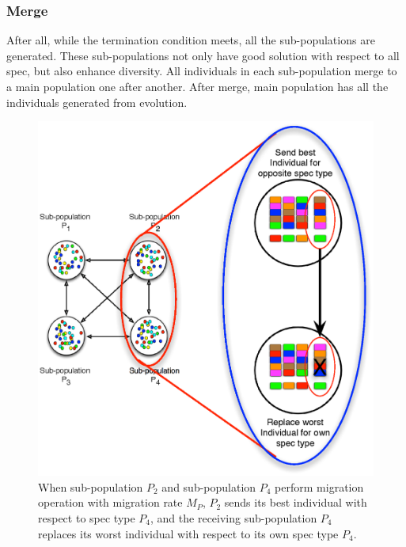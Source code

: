     \subsubsection{Merge}
      After all, while the termination condition meets, all the sub-populations are generated. These sub-populations not only have good solution with respect to all spec, but also enhance diversity. All individuals in each sub-population merge to a main population one after another. After merge, main population has all the individuals generated from evolution. 
  
  
      \begin{figure}[t]
        \centering
        \includegraphics[width=\textwidth]{Fig/PAGEMigration.eps}
        \caption{When sub-population $P_2$ and sub-population $P_4$ perform migration operation with migration rate $M_P$, $P_2$ sends its best individual with respect to spec type $P_4$, and the receiving sub-population $P_4$ replaces its worst individual with respect to its own spec type $P_4$.} 
        \label{fig:Migration}
      \end{figure}

